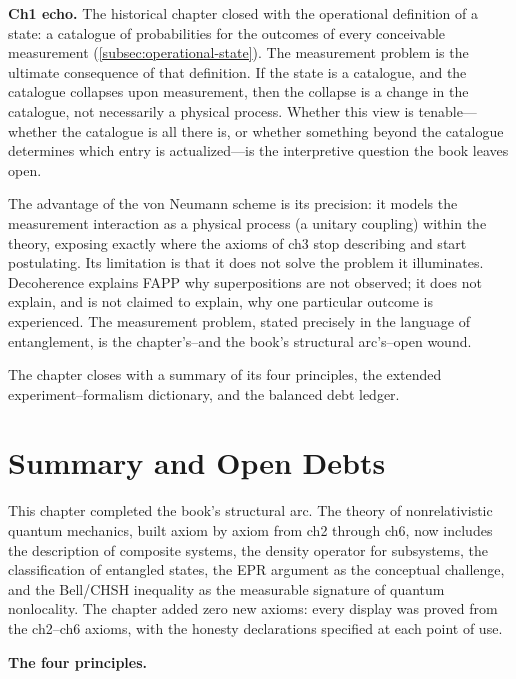 \medskip\noindent\textbf{Ch1 echo.}
The historical chapter closed with the operational definition of a state: a catalogue of probabilities for the outcomes of every conceivable measurement (\ref{subsec:operational-state}). The measurement problem is the ultimate consequence of that definition. If the state is a catalogue, and the catalogue collapses upon measurement, then the collapse is a change in the catalogue, not necessarily a physical process. Whether this view is tenable---whether the catalogue is all there is, or whether something beyond the catalogue determines which entry is actualized---is the interpretive question the book leaves open.

The advantage of the von Neumann scheme is its precision: it models the measurement interaction as a physical process (a unitary coupling) within the theory, exposing exactly where the axioms of ch3 stop describing and start postulating. Its limitation is that it does not solve the problem it illuminates. Decoherence explains FAPP why superpositions are not observed; it does not explain, and is not claimed to explain, why one particular outcome is experienced. The measurement problem, stated precisely in the language of entanglement, is the chapter's--and the book's structural arc's--open wound.

The chapter closes with a summary of its four principles, the extended experiment--formalism dictionary, and the balanced debt ledger.
\section{Summary and Open Debts}
\label{sec:ch7summary}

This chapter completed the book's structural arc. The theory of nonrelativistic quantum mechanics, built axiom by axiom from ch2 through ch6, now includes the description of composite systems, the density operator for subsystems, the classification of entangled states, the EPR argument as the conceptual challenge, and the Bell/CHSH inequality as the measurable signature of quantum nonlocality. The chapter added zero new axioms: every display was proved from the ch2--ch6 axioms, with the honesty declarations specified at each point of use.

\medskip\noindent\textbf{The four principles.}

